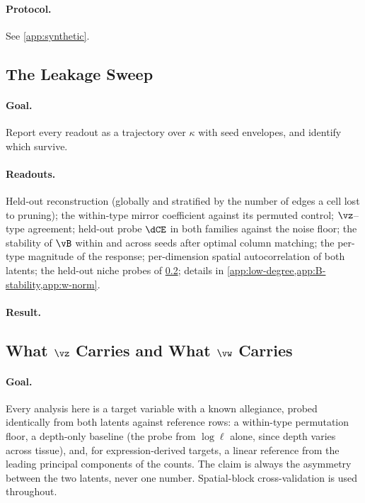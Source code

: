 \paragraph{Protocol.} See \cref{app:synthetic}. 

\subsection{The Leakage Sweep}
\label{sec:sweep-results}

\paragraph{Goal.} Report every readout as a trajectory over $\kappa$ with seed envelopes, and identify which survive.

\paragraph{Readouts.} Held-out reconstruction (globally and stratified by the number of edges a cell lost to pruning); the within-type mirror coefficient against its permuted control; $\vz$--type agreement; held-out probe $\dCE$ in both families against the noise floor; the stability of $\vB$ within and across seeds after optimal column matching; the per-type magnitude of the response; per-dimension spatial autocorrelation of both latents; the held-out niche probes of \cref{sec:allegiance}; details in \cref{app:low-degree,app:B-stability,app:w-norm}.

\paragraph{Result.} 

\subsection{What \texorpdfstring{$\vz$}{z} Carries and What \texorpdfstring{$\vw$}{w} Carries}
\label{sec:allegiance}

\paragraph{Goal.} Every analysis here is a target variable with a known allegiance, probed identically from both latents against reference rows: a within-type permutation floor, a depth-only baseline (the probe from $\log \ell$ alone, since depth varies across tissue), and, for expression-derived targets, a linear reference from the leading principal components of the counts. The claim is always the asymmetry between the two latents, never one number. Spatial-block cross-validation is used throughout.

